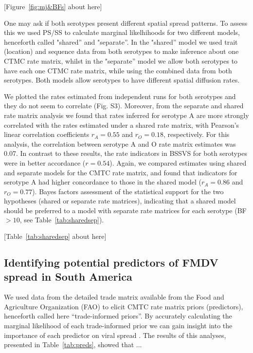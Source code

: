 \documentclass[10pt]{article}
\begin{document}
\begin{center}
 [Figure~\ref{fig:mj&BFs} about here]
\end{center}

One may ask if both serotypes present different spatial spread patterns.
To assess this we used PS/SS to calculate marginal likelhihoods for two different models, henceforth  called "shared'' and "separate''.
In the "shared'' model we used trait (location) and sequence data  from both serotypes to make inference about one CTMC rate matrix, whilst in the "separate'' model we allow both serotypes to have each one CTMC rate matrix, while using the combined data from both serotypes.
Both models allow serotypes to have different spatial diffusion rates.

We plotted the rates estimated from independent runs for both serotypes and they do not seem to correlate (Fig. S3). %
Moreover, from the separate and shared rate matrix analysis we found that rates inferred for serotype A are more strongly correlated with the rates estimated under a shared rate matrix, with Pearson's linear correlation coefficients $r_A=0.55$ and $r_O=0.18$, respectively.
For this analysis, the correlation between serotype A and O rate matrix estimates was $0.07$.
In contrast to these results, the rate indicators in BSSVS for both serotypes were in better accordance ($r=0.54$).
Again, we compared estimates using shared and separate models for the CMTC rate matrix, and found that indicators for serotype A had higher concordance to those in the shared model ($r_A=0.86$ and $r_O=0.77$).
Bayes factors assessment of the statistical support for the two hypotheses (shared or separate rate matrices), indicating that a shared model should be preferred to a model with separate rate matrices for each serotype (BF$>10$, see Table~\ref{tab:sharedsep}).

\begin{center}
 [Table~\ref{tab:sharedsep} about here]
\end{center}

\subsection*{Identifying potential predictors of FMDV spread in South America}

We used data from the detailed trade matrix available from the Food and Agriculture Organization (FAO) to elicit CMTC rate matrix priors (predictors), henceforth called here ``trade-informed priors''.
By accurately calculating the marginal likelihood of each trade-informed prior we can gain insight into the importance of each predictor on viral spread \cite{Carvalho2012,Nelson2011}.
The results of this analyses, presented in Table~\ref{tab:preds}, showed that ... %
\end{document}
